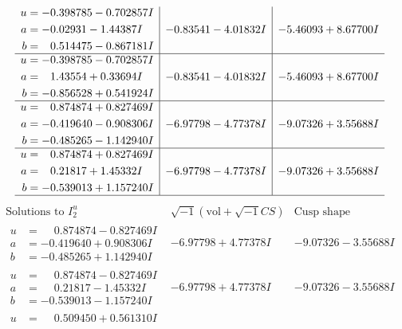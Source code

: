 \documentclass[1p]{elsarticle_modified}
\theoremstyle{definition}
\newcommand{\I}{\sqrt{-1}}
\begin{document}
$$\begin{array}{c|c|c}
\begin{aligned}
u &= -0.398785 - 0.702857 I \\
a &= -0.02931 - 1.44387 I \\
b &= \phantom{-}0.514475 - 0.867181 I\end{aligned}
 & -0.83541 - 4.01832 I & -5.46093 + 8.67700 I \\ \hline\begin{aligned}
u &= -0.398785 - 0.702857 I \\
a &= \phantom{-}1.43554 + 0.33694 I \\
b &= -0.856528 + 0.541924 I\end{aligned}
 & -0.83541 - 4.01832 I & -5.46093 + 8.67700 I \\ \hline\begin{aligned}
u &= \phantom{-}0.874874 + 0.827469 I \\
a &= -0.419640 - 0.908306 I \\
b &= -0.485265 - 1.142940 I\end{aligned}
 & -6.97798 - 4.77378 I & -9.07326 + 3.55688 I \\ \hline\begin{aligned}
u &= \phantom{-}0.874874 + 0.827469 I \\
a &= \phantom{-}0.21817 + 1.45332 I \\
b &= -0.539013 + 1.157240 I\end{aligned}
 & -6.97798 - 4.77378 I & -9.07326 + 3.55688 I\\
 \hline 
 \end{array}$$\newpage$$\begin{array}{c|c|c}  
\text{Solutions to }I^u_{2}& \I (\text{vol} + \sqrt{-1}CS) & \text{Cusp shape}\\
 \hline 
\begin{aligned}
u &= \phantom{-}0.874874 - 0.827469 I \\
a &= -0.419640 + 0.908306 I \\
b &= -0.485265 + 1.142940 I\end{aligned}
 & -6.97798 + 4.77378 I & -9.07326 - 3.55688 I \\ \hline\begin{aligned}
u &= \phantom{-}0.874874 - 0.827469 I \\
a &= \phantom{-}0.21817 - 1.45332 I \\
b &= -0.539013 - 1.157240 I\end{aligned}
 & -6.97798 + 4.77378 I & -9.07326 - 3.55688 I \\ \hline\begin{aligned}
u &= \phantom{-}0.509450 + 0.561310 I \\

\end{aligned}
\end{array}$$
\end{document}
